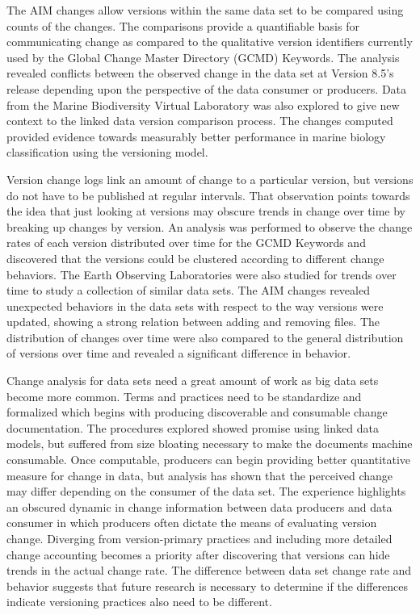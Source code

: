 The AIM changes allow versions within the same data set to be compared using counts of the changes.
The comparisons provide a quantifiable basis for communicating change as compared to the qualitative version identifiers currently used by the Global Change Master Directory (GCMD) Keywords.
The analysis revealed conflicts between the observed change in the data set at Version 8.5's release depending upon the perspective of the data consumer or producers.
Data from the Marine Biodiversity Virtual Laboratory was also explored to give new context to the linked data version comparison process.
The changes computed provided evidence towards measurably better performance in marine biology classification using the versioning model.

Version change logs link an amount of change to a particular version, but versions do not have to be published at regular intervals.
That observation points towards the idea that just looking at versions may obscure trends in change over time by breaking up changes by version.
An analysis was performed to observe the change rates of each version distributed over time for the GCMD Keywords and discovered that the versions could be clustered according to different change behaviors.
The Earth Observing Laboratories were also studied for trends over time to study a collection of similar data sets.
The AIM changes revealed unexpected behaviors in the data sets with respect to the way versions were updated, showing a strong relation between adding and removing files.
The distribution of changes over time were also compared to the general distribution of versions over time and revealed a significant difference in behavior.

Change analysis for data sets need a great amount of work as big data sets become more common.
Terms and practices need to be standardize and formalized which begins with producing discoverable and consumable change documentation.
The procedures explored showed promise using linked data models, but suffered from size bloating necessary to make the documents machine consumable.
Once computable, producers can begin providing better quantitative measure for change in data, but analysis has shown that the perceived change may differ depending on the consumer of the data set.
The experience highlights an obscured dynamic in change information between data producers and data consumer in which producers often dictate the means of evaluating version change.
Diverging from version-primary practices and including more detailed change accounting becomes a priority after discovering that versions can hide trends in the actual change rate.
The difference between data set change rate and behavior suggests that future research is necessary to determine if the differences indicate versioning practices also need to be different.